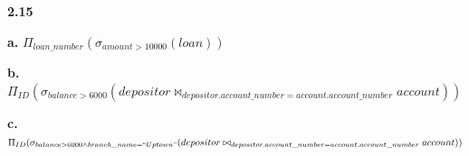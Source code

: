 \documentclass{article}
\begin{document}
\noindent\textbf{2.15}\par
\textbf{a.} \(\Pi_{loan\_number}(\sigma_{amount>10000}(loan))\)\par
\textbf{b.} \( \Pi_{ID}(\sigma_{balance>6000}(depositor\bowtie_{depositor . account\_number=account . account\_number }account)) \)\par
\large
\textbf{c.} \( \Pi_{ID}(\sigma_{balance>6000\wedge branch\_name=``Uptown"}(depositor\bowtie_{depositor. account\_number = account . account\_number}account)) \)
\end{document}

